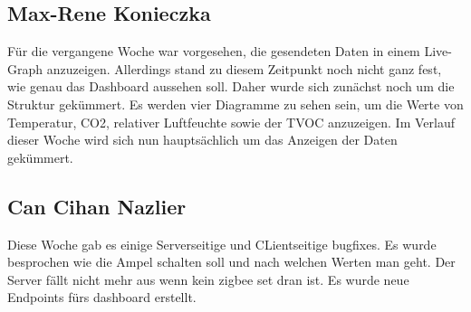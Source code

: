 \documentclass[]{article}
\begin{document}
\subsection{Max-Rene Konieczka}
Für die vergangene Woche war vorgesehen, die gesendeten Daten in einem Live-Graph anzuzeigen. Allerdings stand zu diesem Zeitpunkt noch nicht ganz fest, wie genau das Dashboard aussehen soll. Daher wurde sich zunächst noch um die Struktur gekümmert. Es werden vier Diagramme zu sehen sein, um die Werte von Temperatur, CO2, relativer Luftfeuchte sowie der TVOC anzuzeigen. Im Verlauf dieser Woche wird sich nun hauptsächlich um das Anzeigen der Daten gekümmert. 

\subsection{Can Cihan Nazlier}
Diese Woche gab es einige Serverseitige und CLientseitige bugfixes. Es wurde besprochen wie die Ampel schalten soll und nach welchen Werten man geht. Der Server fällt nicht mehr aus wenn kein zigbee set dran ist. Es wurde neue Endpoints fürs dashboard erstellt.

\printbibliography
\end{document}
